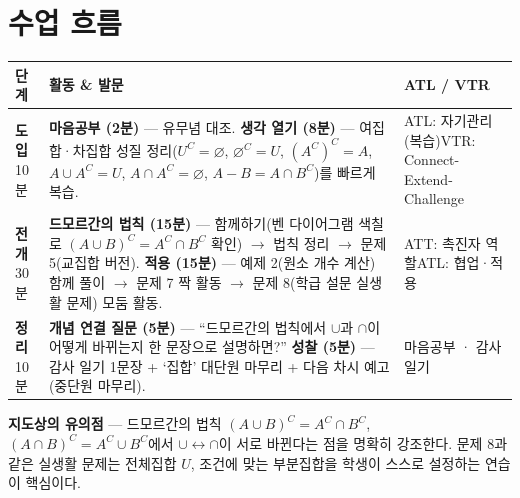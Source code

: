 \documentclass[11pt,a4paper]{article}
\begin{document}
\section{수업 흐름}
\begin{tabularx}{\linewidth}{@{}>{\centering\arraybackslash}p{1.6cm}X>{\raggedright\arraybackslash\small}p{3.1cm}@{}}
\toprule
\textbf{단계} & \textbf{활동 \& 발문} & \textbf{ATL / VTR} \\
\midrule
\textcolor{goldstrong}{\textbf{도입}}\newline\footnotesize 10분 &
\textbf{마음공부 (2분)} --- 유무념 대조.\newline
\textbf{생각 열기 (8분)} --- 여집합·차집합 성질 정리($U^C=\varnothing$, $\varnothing^C=U$, $(A^C)^C=A$, $A\cup A^C=U$, $A\cap A^C=\varnothing$, $A-B=A\cap B^C$)를 빠르게 복습. &
ATL: 자기관리(복습)\newline VTR: Connect-Extend-Challenge \\
\addlinespace
\textcolor{goldstrong}{\textbf{전개}}\newline\footnotesize 30분 &
\textbf{드모르간의 법칙 (15분)} --- 함께하기(벤 다이어그램 색칠로 $(A\cup B)^C=A^C\cap B^C$ 확인) $\to$ 법칙 정리 $\to$ 문제 5(교집합 버전).\newline
\textbf{적용 (15분)} --- 예제 2(원소 개수 계산) 함께 풀이 $\to$ 문제 7 짝 활동 $\to$ 문제 8(학급 설문 실생활 문제) 모둠 활동. &
ATT: 촉진자 역할\newline ATL: 협업·적용 \\
\addlinespace
\textcolor{goldstrong}{\textbf{정리}}\newline\footnotesize 10분 &
\textbf{개념 연결 질문 (5분)} --- ``드모르간의 법칙에서 $\cup$과 $\cap$이 어떻게 바뀌는지 한 문장으로 설명하면?''\newline
\textbf{성찰 (5분)} --- 감사 일기 1문장 + `집합' 대단원 마무리 + 다음 차시 예고(중단원 마무리). &
마음공부 · 감사 일기 \\
\bottomrule
\end{tabularx}

\begin{calloutbox}
\textbf{지도상의 유의점} --- 드모르간의 법칙 $(A\cup B)^C=A^C\cap B^C$, $(A\cap B)^C=A^C\cup B^C$에서 $\cup\leftrightarrow\cap$이 서로 바뀐다는 점을 명확히 강조한다. 문제 8과 같은 실생활 문제는 전체집합 $U$, 조건에 맞는 부분집합을 학생이 스스로 설정하는 연습이 핵심이다.
\end{calloutbox}
\end{document}

